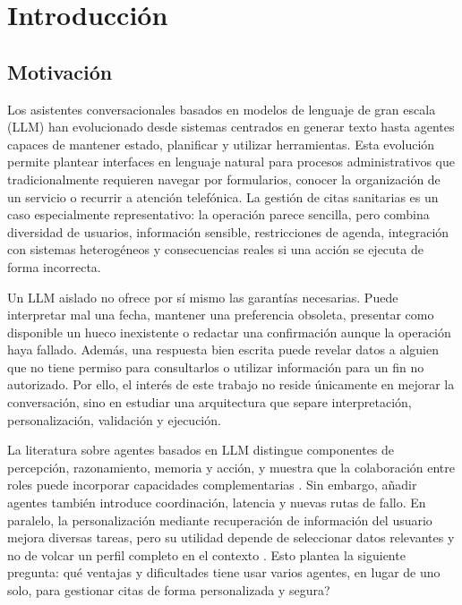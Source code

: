 \chapter{Introducción}
\label{chap:introduccion}

\section{Motivación}

Los asistentes conversacionales basados en modelos de lenguaje de gran escala
(LLM) han evolucionado desde sistemas centrados en generar texto hasta agentes
capaces de mantener estado, planificar y utilizar herramientas. Esta evolución
permite plantear interfaces en lenguaje natural para procesos administrativos
que tradicionalmente requieren navegar por formularios, conocer la organización
de un servicio o recurrir a atención telefónica. La gestión de citas sanitarias
es un caso especialmente representativo: la operación parece sencilla, pero
combina diversidad de usuarios, información sensible, restricciones de agenda,
integración con sistemas heterogéneos y consecuencias reales si una acción se
ejecuta de forma incorrecta.

Un LLM aislado no ofrece por sí mismo las garantías necesarias. Puede interpretar
mal una fecha, mantener una preferencia obsoleta, presentar como disponible un
hueco inexistente o redactar una confirmación aunque la operación haya fallado.
Además, una respuesta bien escrita puede revelar datos a alguien que no tiene
permiso para consultarlos o utilizar información para un fin no autorizado.
Por ello, el interés de este trabajo no reside únicamente en
mejorar la conversación, sino en estudiar una arquitectura que separe
interpretación, personalización, validación y ejecución.

La literatura sobre agentes basados en LLM distingue componentes de percepción,
razonamiento, memoria y acción, y muestra que la colaboración entre roles puede
incorporar capacidades complementarias \citep{xi2023agents,wu2024autogen}. Sin
embargo, añadir agentes también introduce coordinación, latencia y nuevas rutas
de fallo. En paralelo, la personalización mediante recuperación de información
del usuario mejora diversas tareas, pero su utilidad depende de seleccionar
datos relevantes y no de volcar un perfil completo en el contexto
\citep{salemi2024lamp}. Esto plantea la siguiente pregunta:
\textquestiondown{}qué ventajas y dificultades tiene usar varios agentes, en lugar
de uno solo, para gestionar citas de forma personalizada y segura?


